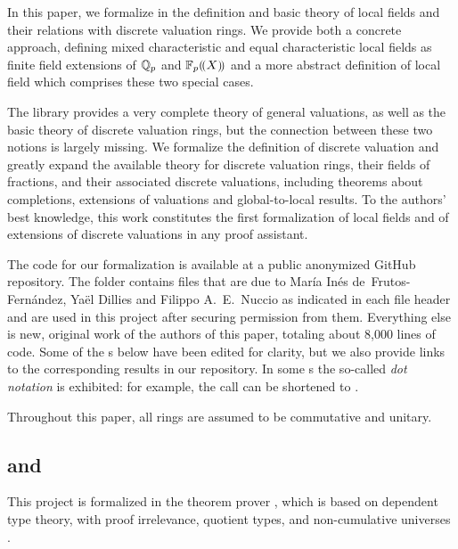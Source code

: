 \documentclass[sigplan,10pt,anonymous,review]{acmart}
\begin{document}
In this paper, we formalize in \lean the definition and basic theory of local fields and their relations with discrete valuation rings. We provide both a concrete approach, defining mixed characteristic and equal characteristic local fields as finite field extensions of $\mathbb{Q}_p$ and ${\mathbb{F}_{p}}(\!(X)\!)$ and a more abstract definition of local field which comprises these two special cases. 

The \mathlib library provides 
a very complete theory of general valuations, as well as the basic theory of discrete valuation rings, but the connection between these two notions is largely missing. We formalize the definition of discrete valuation and greatly expand the available theory for discrete valuation rings, their fields of fractions, and their associated discrete valuations, including theorems about completions, extensions of valuations and global-to-local results.
To the authors' best knowledge, this work constitutes the first formalization of local fields and of extensions of discrete valuations in any proof assistant.

The \lean[\empty] code for our formalization is available at a public anonymized GitHub repository\href{https://github.com/LCFT-Lean/local_fields}{\extlink}. The  folder\href{https://github.com/LCFT-Lean/local_fields/tree/master/src/from_mathlib}{\extlink} contains files that are due to Mar\'ia In\'es de~Frutos-Fernández, Yaël Dillies and Filippo A.~E.~Nuccio as indicated in each file header and are used in this project after securing permission from them. Everything else is new, original work of the authors of this paper, totaling about 8,000 lines of code. Some of the \LClistingname s below have been edited for clarity, but we also provide links to the corresponding results in our repository. In some \LClistingname s the so-called \emph{dot notation} is exhibited: for example, the call  can be shortened to .

Throughout this paper, all rings are assumed to be commutative and unitary.

\subsection{\texorpdfstring{\lean[\empty] and \mathlib}{Lean and mathlib}}
This project is formalized in the \lean theorem prover \cite{Lean3}, which is based on dependent type theory, with proof irrelevance, quotient types, and non-cumulative universes \cite{TypeTheory}.
\end{document}
